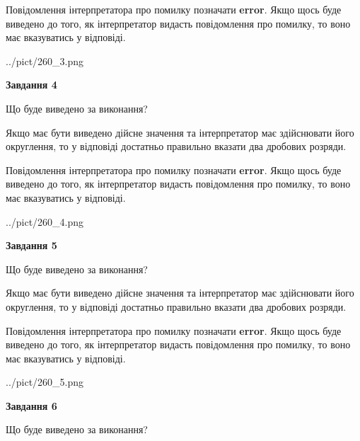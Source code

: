 \documentclass[12pt, ukrainian]{article}
\begin{document}
{\begin {Large}
Повідомлення інтерпретатора про помилку позначати \textbf{error}.
Якщо щось буде виведено до того, як інтерпретатор видасть повідомлення про помилку, 
то воно має вказуватись у відповіді. \par

\begin{center}
	{../pict/260_3.png}
\end{center}
\newpage

{\begin {center}\textbf{Завдання 4}\end {center}}\par
Що буде виведено за виконання? \par

Якщо має бути виведено дійсне значення та інтерпретатор має здійснювати його округлення, 
то у відповіді достатньо правильно вказати два дробових розряди.

Повідомлення інтерпретатора про помилку позначати \textbf{error}.
Якщо щось буде виведено до того, як інтерпретатор видасть повідомлення про помилку, 
то воно має вказуватись у відповіді. \par

\begin{center}
	{../pict/260_4.png}
\end{center}
\newpage

{\begin {center}\textbf{Завдання 5}\end {center}}\par
Що буде виведено за виконання? \par

Якщо має бути виведено дійсне значення та інтерпретатор має здійснювати його округлення, 
то у відповіді достатньо правильно вказати два дробових розряди.

Повідомлення інтерпретатора про помилку позначати \textbf{error}.
Якщо щось буде виведено до того, як інтерпретатор видасть повідомлення про помилку, 
то воно має вказуватись у відповіді. \par

\begin{center}
	{../pict/260_5.png}
\end{center}
\newpage

{\begin {center}\textbf{Завдання 6}\end {center}}\par
Що буде виведено за виконання? \par


\end{Large}}
\end{document}
